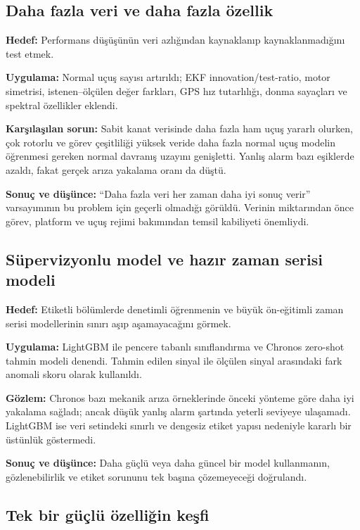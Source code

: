 \documentclass[11pt,a4paper]{article}
\begin{document}
\subsection{Daha fazla veri ve daha fazla özellik}

\textbf{Hedef:} Performans düşüşünün veri azlığından kaynaklanıp kaynaklanmadığını
test etmek.

\textbf{Uygulama:} Normal uçuş sayısı artırıldı; EKF innovation/test-ratio,
motor simetrisi, istenen--ölçülen değer farkları, GPS hız tutarlılığı, donma
sayaçları ve spektral özellikler eklendi.

\textbf{Karşılaşılan sorun:} Sabit kanat verisinde daha fazla ham uçuş yararlı
olurken, çok rotorlu ve görev çeşitliliği yüksek veride daha fazla normal uçuş
modelin öğrenmesi gereken normal davranış uzayını genişletti. Yanlış alarm bazı
eşiklerde azaldı, fakat gerçek arıza yakalama oranı da düştü.

\textbf{Sonuç ve düşünce:} ``Daha fazla veri her zaman daha iyi sonuç verir''
varsayımının bu problem için geçerli olmadığı görüldü. Verinin miktarından önce
görev, platform ve uçuş rejimi bakımından temsil kabiliyeti önemliydi.

\subsection{Süpervizyonlu model ve hazır zaman serisi modeli}

\textbf{Hedef:} Etiketli bölümlerde denetimli öğrenmenin ve büyük ön-eğitimli
zaman serisi modellerinin sınırı aşıp aşamayacağını görmek.

\textbf{Uygulama:} LightGBM ile pencere tabanlı sınıflandırma ve Chronos
zero-shot tahmin modeli denendi. Tahmin edilen sinyal ile ölçülen sinyal
arasındaki fark anomali skoru olarak kullanıldı.

\textbf{Gözlem:} Chronos bazı mekanik arıza örneklerinde önceki yönteme göre
daha iyi yakalama sağladı; ancak düşük yanlış alarm şartında yeterli seviyeye
ulaşamadı. LightGBM ise veri setindeki sınırlı ve dengesiz etiket yapısı nedeniyle
kararlı bir üstünlük göstermedi.

\textbf{Sonuç ve düşünce:} Daha güçlü veya daha güncel bir model kullanmanın,
gözlenebilirlik ve etiket sorununu tek başına çözemeyeceği doğrulandı.

\subsection{Tek bir güçlü özelliğin keşfi}
\end{document}
